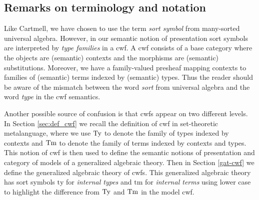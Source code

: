 \documentclass{mscs}
\newcommand{\FYI}[1]{{#1}}
\newcommand{\ty}{\mathrm{ty}}
\newcommand{\tm}{\mathrm{tm}}
\begin{document}


\subsection*{Remarks on terminology and notation}
Like Cartmell, we have chosen to use the term {\em sort symbol} from many-sorted universal algebra. However, in our semantic notion of \FYI{presentation} sort symbols are interpreted by {\em type families} in a cwf. A cwf consists of a base category where the objects are (semantic) contexts and the morphisms are (semantic) substitutions. Moreover, we have a family-valued presheaf mapping contexts to families of (semantic) terms indexed by (semantic) types. Thus the reader should be aware of the mismatch between the word {\em sort} from universal algebra and the word {\em type} in the cwf semantics.

Another possible source of confusion is that cwfs appear on two different levels. In Section \ref{sec:def_cwf} we recall the definition of cwf in set-theoretic metalanguage, where we use $\mathrm{Ty}$ to denote the family of types indexed by contexts and $\mathrm{Tm}$ to denote the family of terms indexed by contexts and types. This notion of cwf is then used to define the semantic notions of \FYI{presentation} and category of models of a generalized algebraic theory. Then in Section \ref{gat-cwf} we define the generalized algebraic theory of cwfs. This generalized algebraic theory has sort symbols $\ty$ for {\em internal types} and $\tm$ for {\em internal terms} using lower case to highlight the difference from $\mathrm{Ty}$ and $\mathrm{Tm}$ in the model cwf.
\end{document}
